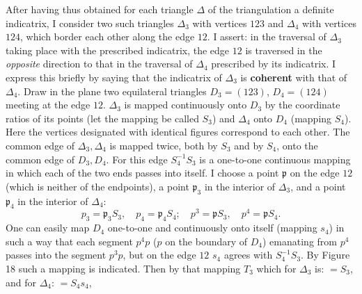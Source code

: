 \documentclass{article}
\begin{document}

After having thus obtained for each triangle $\Delta$ of the triangulation a definite indicatrix, I consider two such triangles $\Delta_3$ with vertices $123$ and $\Delta_4$ with vertices $124$, which border each other along the edge $12$. I assert: in the traversal of $\Delta_3$ taking place with the prescribed indicatrix, the edge $12$ is traversed in the \emph{opposite} direction to that in the traversal of $\Delta_4$ prescribed by its indicatrix. I express this briefly by saying that the indicatrix of $\Delta_3$ is \textbf{coherent} with that of $\Delta_4$. Draw in the plane two equilateral triangles $D_3 = (123)$, $D_4 = (124)$ meeting at the edge $12$. $\Delta_3$ is mapped continuously onto $D_3$ by the coordinate ratios of its points (let the mapping be called $S_3$) and $\Delta_4$ onto $D_4$ (mapping $S_4$). Here the vertices designated with identical figures correspond to each other. The common edge of $\Delta_3, \Delta_4$ is mapped twice, both by $S_3$ and by $S_4$, onto the common edge of $D_3, D_4$. For this edge $S_4^{-1} S_3$ is a one-to-one continuous mapping in which each of the two ends passes into itself. I choose a point $\mathfrak{p}$ on the edge $12$ (which is neither of the endpoints), a point $\mathfrak{p}_3$ in the interior of $\Delta_3$, and a point $\mathfrak{p}_4$ in the interior of $\Delta_4$:
\[ p_3 = \mathfrak{p}_3 S_3, \quad p_4 = \mathfrak{p}_4 S_4; \quad p^3 = \mathfrak{p} S_3, \quad p^4 = \mathfrak{p} S_4. \]
One can easily map $D_4$ one-to-one and continuously onto itself (mapping $s_4$) in such a way that each segment $p^4 p$ ($p$ on the boundary of $D_4$) emanating from $p^4$ passes into the segment $p^3 p$, but on the edge $12$ $s_4$ agrees with $S_4^{-1} S_3$. By Figure 18 such a mapping is indicated. Then by that mapping $T_3$ which for $\Delta_3$ is: $= S_3$, and for $\Delta_4$: $= S_4 s_4$,
\end{document}
